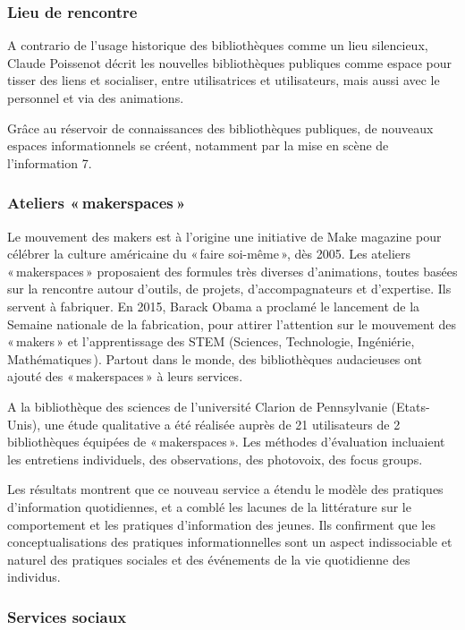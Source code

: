 \documentclass[french,a4paper,12pt]{article}
\begin{document}
\subsubsection{Lieu de rencontre}

\quad A contrario de l’usage historique des bibliothèques comme un lieu silencieux, Claude Poissenot  décrit les nouvelles bibliothèques publiques comme espace pour tisser des liens et socialiser, entre utilisatrices et utilisateurs, mais aussi avec le personnel et via des animations. 

Grâce au réservoir de connaissances des bibliothèques publiques, de nouveaux espaces informationnels se créent, notamment par la mise en scène de l’information 7. 

\subsubsection{Ateliers « makerspaces »\citep{makers2020}} 

\quad Le mouvement des makers est à l’origine une initiative de Make magazine pour célébrer la culture américaine du « faire soi-même », dès 2005. Les ateliers « makerspaces » proposaient des formules très diverses d’animations, toutes basées sur la rencontre autour d’outils, de projets, d’accompagnateurs et d’expertise. Ils servent à fabriquer. En 2015, Barack Obama a proclamé le lancement de la Semaine nationale de la fabrication, pour attirer l’attention sur le mouvement des « makers » et l’apprentissage des STEM (Sciences, Technologie, Ingéniérie, Mathématiques ). Partout dans le monde, des bibliothèques audacieuses ont ajouté des « makerspaces » à leurs services. 

A la bibliothèque des sciences de l’université Clarion de Pennsylvanie (Etats-Unis), une étude qualitative a été réalisée auprès de 21 utilisateurs de 2 bibliothèques équipées de « makerspaces ». Les méthodes d’évaluation incluaient les entretiens individuels, des observations, des photovoix, des focus groups. 

Les résultats montrent que ce nouveau service a étendu le modèle des pratiques d'information quotidiennes, et a comblé les lacunes de la littérature sur le comportement et les pratiques d'information des jeunes. Ils confirment que les conceptualisations des pratiques informationnelles sont un aspect indissociable et naturel des pratiques sociales et des événements de la vie quotidienne des individus. 

\subsubsection*{Services sociaux\citep{servicessociaux2008}}
\end{document}

